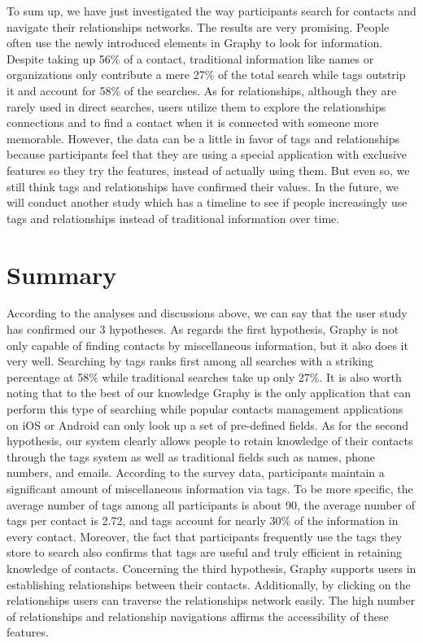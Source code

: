 To sum up, we have just investigated the way participants search for contacts and navigate their relationships networks. The results are very promising. People often use the newly introduced elements in Graphy to look for information. Despite taking up 56\% of a contact, traditional information like names or organizations only contribute a mere 27\% of the total search while tags outstrip it and account for 58\% of the searches. As for relationships, although they are rarely used in direct searches, users utilize them to explore the relationships connections and to find a contact when it is connected with someone more memorable. However, the data can be a little in favor of tags and relationships because participants feel that they are using a special application with exclusive features so they try the features, instead of actually using them. But even so, we still think tags and relationships have confirmed their values. In the future, we will conduct another study which has a timeline to see if people increasingly use tags and relationships instead of traditional information over time.

\section{Summary}\label{results_summary}
According to the analyses and discussions above, we can say that the user study has confirmed our 3 hypotheses. As regards the first hypothesis, Graphy is not only capable of finding contacts by miscellaneous information, but it also does it very well. Searching by tags ranks first among all searches with a striking percentage at 58\% while traditional searches take up only 27\%. It is also worth noting that to the best of our knowledge Graphy is the only application that can perform this type of searching while popular contacts management applications on iOS or Android can only look up a set of pre-defined fields. As for the second hypothesis, our system clearly allows people to retain knowledge of their contacts through the tags system as well as traditional fields such as names, phone numbers, and emails. According to the survey data, participants maintain a significant amount of miscellaneous information via tags. To be more specific, the average number of tags among all participants is about 90, the average number of tags per contact is 2.72, and tags account for nearly 30\% of the information in every contact. Moreover, the fact that participants frequently use the tags they store to search also confirms that tags are useful and truly efficient in retaining knowledge of contacts. Concerning the third hypothesis, Graphy supports users in establishing relationships between their contacts. Additionally, by clicking on the relationships users can traverse the relationships network easily. The high number of relationships and relationship navigations affirms the accessibility of these features.

